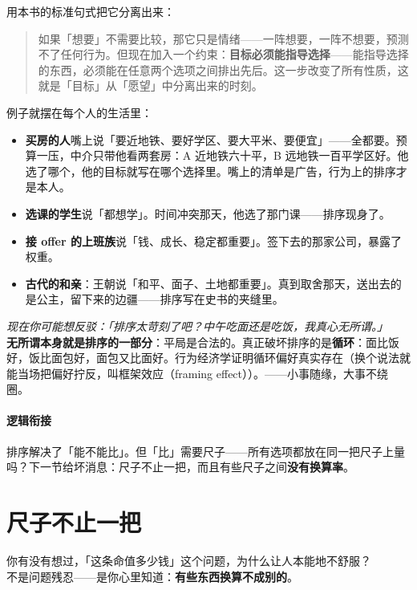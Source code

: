 \documentclass[../../main2.tex]{subfiles}
\begin{document}
用本书的标准句式把它分离出来：

\begin{quote}
	如果「想要」不需要比较，那它只是情绪——一阵想要，一阵不想要，预测不了任何行为。但现在加入一个约束：\textbf{目标必须能指导选择}——能指导选择的东西，必须能在任意两个选项之间排出先后。这一步改变了所有性质，这就是「目标」从「愿望」中分离出来的时刻。
\end{quote}

例子就摆在每个人的生活里：

\begin{itemize}
	\item \textbf{买房的人}嘴上说「要近地铁、要好学区、要大平米、要便宜」——全都要。预算一压，中介只带他看两套房：A 近地铁六十平，B 远地铁一百平学区好。他选了哪个，他的目标就写在哪个选择里。嘴上的清单是广告，行为上的排序才是本人。
	\item \textbf{选课的学生}说「都想学」。时间冲突那天，他选了那门课——排序现身了。
	\item \textbf{接 offer 的上班族}说「钱、成长、稳定都重要」。签下去的那家公司，暴露了权重。
	\item \textbf{古代的和亲}：王朝说「和平、面子、土地都重要」。真到取舍那天，送出去的是公主，留下来的边疆——排序写在史书的夹缝里。
\end{itemize}

\begin{questionbox}
	\textit{现在你可能想反驳：「排序太苛刻了吧？中午吃面还是吃饭，我真心无所谓。」}\\
	\textbf{无所谓本身就是排序的一部分}：平局是合法的。真正破坏排序的是\textbf{循环}：面比饭好，饭比面包好，面包又比面好。行为经济学证明循环偏好真实存在（换个说法就能当场把偏好拧反，叫框架效应（framing effect））。——小事随缘，大事不绕圈。
\end{questionbox}

\paragraph*{逻辑衔接}
	排序解决了「能不能比」。但「比」需要尺子——所有选项都放在同一把尺子上量吗？下一节给坏消息：尺子不止一把，而且有些尺子之间\textbf{没有换算率}。

\section{尺子不止一把}

\begin{readingnote}
	你有没有想过，「这条命值多少钱」这个问题，为什么让人本能地不舒服？\\
	不是问题残忍——是你心里知道：\textbf{有些东西换算不成别的}。
\end{readingnote}
\end{document}
